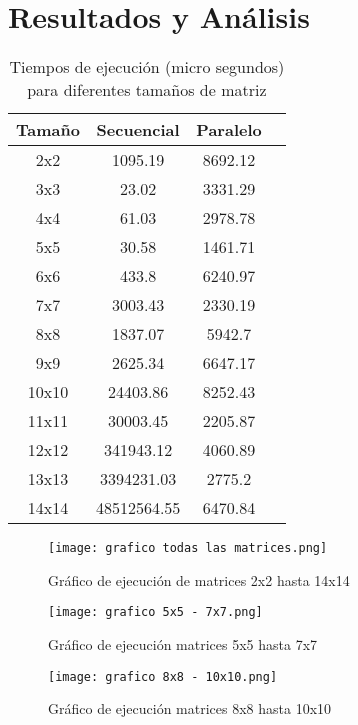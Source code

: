 \documentclass[12pt]{article}
\begin{document}
\section*{Resultados y Análisis}
\begin{table}[H]
\centering
\caption{Tiempos de ejecución (micro segundos) para diferentes tamaños de matriz}
\begin{tabular}{|c|c|c|c|}
\hline
\textbf{Tamaño} & \textbf{Secuencial} & \textbf{Paralelo} \\ \hline
2x2 & 1095.19 & 8692.12\\ \hline
3x3 & 23.02 & 3331.29\\ \hline
4x4 & 61.03 & 2978.78\\ \hline
5x5 & 30.58 & 1461.71\\ \hline
6x6 & 433.8 & 6240.97\\ \hline
7x7 & 3003.43 & 2330.19\\ \hline
8x8 & 1837.07 & 5942.7\\ \hline
9x9 & 2625.34 & 6647.17\\ \hline
10x10 & 24403.86 & 8252.43\\ \hline
11x11 & 30003.45 & 2205.87\\ \hline
12x12 & 341943.12 & 4060.89\\ \hline
13x13 & 3394231.03 & 2775.2\\ \hline
14x14 & 48512564.55 & 6470.84\\ \hline
\end{tabular}
\end{table}

\begin{figure}[H]
    \centering
    \texttt{[image: grafico todas las matrices.png]}
    \caption{Gráfico de ejecución de matrices 2x2 hasta 14x14}
    \label{fig:enter-label1}
\end{figure}

\begin{figure}[H]
    \centering
    \texttt{[image: grafico 5x5 - 7x7.png]}
    \caption{Gráfico de ejecución matrices 5x5 hasta 7x7}
    \label{fig:enter-label2}
\end{figure}

\begin{figure}[H]
    \centering
    \texttt{[image: grafico 8x8 - 10x10.png]}
    \caption{Gráfico de ejecución matrices 8x8 hasta 10x10}
    \label{fig:enter-label3}
\end{figure}
\end{document}
